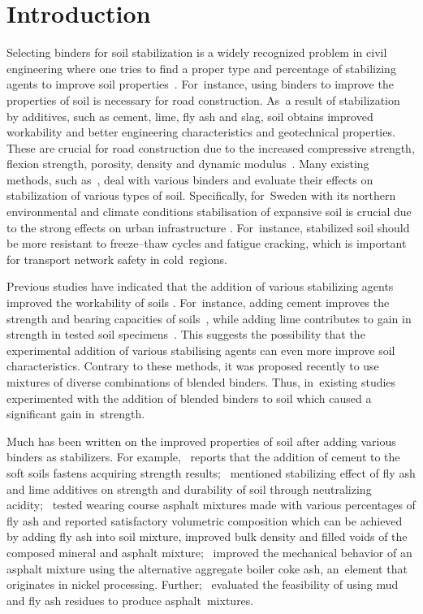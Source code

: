 \documentclass[constrmater,article,accept,pdftex,moreauthors]{Definitions/mdpi}
\begin{document}
\section{Introduction}

Selecting binders for soil stabilization is a widely recognized problem in civil engineering where one tries to find a proper type and percentage of stabilizing agents to improve soil properties~\cite{Consoli2019,daRocha,Freitag}. For~instance, using binders to improve the properties of soil is necessary for road construction. As~a result of stabilization by additives, such as cement, lime, fly ash and slag, soil obtains improved workability and better engineering characteristics and geotechnical properties. These are crucial for road construction due to the increased compressive strength, flexion strength, porosity, density and dynamic modulus~\cite{Carasca}. Many existing methods, such as~\cite{Mypati,Sargent}, deal with various binders and evaluate their effects on stabilization of various types of soil. Specifically, for~Sweden with its northern environmental and climate conditions stabilisation of expansive soil is crucial due to the strong effects on urban infrastructure \citep{Amorim,Gustavsson}. For~instance, stabilized soil should be more resistant to freeze--thaw cycles and fatigue cracking, which is important for transport network safety in cold~regions. 

Previous studies have indicated that the addition of various stabilizing agents improved the workability of soils \citep{Etim,Fasihnikoutalab,Kogbara,Lindh2022b,Mavroulidou}. For~instance, adding cement improves the strength and bearing capacities of soils~\cite{Ekpo}, while adding lime contributes to gain in strength in tested soil specimens~\cite{Frempong}. This suggests the possibility that the experimental addition of various stabilising agents can even more improve soil characteristics. Contrary to these methods, it was proposed recently to use mixtures of diverse combinations of blended binders. Thus, in~existing studies \citep{Abbey,AlHdabi,ma15217798,Jafer,Lietal2021,Wangetal2015} experimented with the addition of blended binders to soil which caused a significant gain in~strength.

Much has been written on the improved properties of soil after adding various binders as stabilizers. For example,~\cite{Consoli} reports that the addition of cement to the soft soils fastens acquiring strength results;~\cite{MESKINI2021129161} mentioned stabilizing effect of fly ash and lime additives on strength and durability of soil through neutralizing acidity;~\cite{Mirkovic} tested wearing course asphalt mixtures made with various percentages of fly ash and reported satisfactory volumetric composition which can be achieved by adding fly ash into soil mixture, improved bulk density and filled voids of the composed mineral and asphalt mixture;~\cite{app12189134} improved the mechanical behavior of an asphalt mixture using the alternative aggregate boiler coke ash, an~element that originates in nickel processing. Further;~\cite{Lima} evaluated the feasibility of using mud and fly ash residues to produce asphalt~mixtures. 
\end{document}
